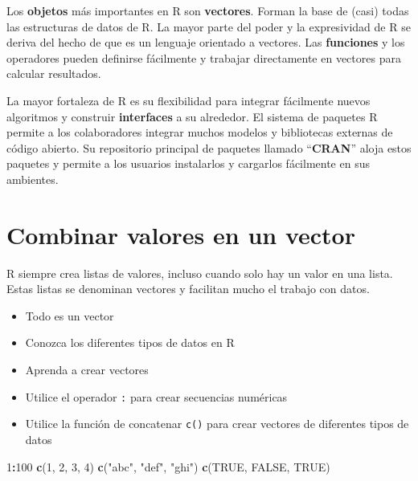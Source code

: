 \documentclass[
]{book}
\newenvironment{Shaded}{\begin{snugshade}}{\end{snugshade}}
\newcommand{\DecValTok}[1]{\textcolor[rgb]{0.00,0.00,0.81}{#1}}
\newcommand{\KeywordTok}[1]{\textcolor[rgb]{0.13,0.29,0.53}{\textbf{#1}}}
\newcommand{\NormalTok}[1]{#1}
\newcommand{\OperatorTok}[1]{\textcolor[rgb]{0.81,0.36,0.00}{\textbf{#1}}}
\newcommand{\OtherTok}[1]{\textcolor[rgb]{0.56,0.35,0.01}{#1}}
\newcommand{\StringTok}[1]{\textcolor[rgb]{0.31,0.60,0.02}{#1}}
\providecommand{\tightlist}{%
  \setlength{\itemsep}{0pt}\setlength{\parskip}{0pt}}
\begin{document}
Los \textbf{objetos} más importantes en R son \textbf{vectores}. Forman la base de (casi) todas las estructuras de datos de R. La mayor parte del poder y la expresividad de R se deriva del hecho de que es un lenguaje orientado a vectores. Las \textbf{funciones} y los operadores pueden definirse fácilmente y trabajar directamente en vectores para calcular resultados.

La mayor fortaleza de R es su flexibilidad para integrar fácilmente nuevos algoritmos y construir \textbf{interfaces} a su alrededor. El sistema de paquetes R permite a los colaboradores integrar muchos modelos y bibliotecas externas de código abierto. Su repositorio principal de paquetes llamado ``\textbf{CRAN}'' aloja estos paquetes y permite a los usuarios instalarlos y cargarlos fácilmente en sus ambientes.

\hypertarget{combinar-valores-en-un-vector}{%
\section{Combinar valores en un vector}\label{combinar-valores-en-un-vector}}

R siempre crea listas de valores, incluso cuando solo hay un valor en una lista. Estas listas se denominan vectores y facilitan mucho el trabajo con datos.

\begin{itemize}
\tightlist
\item
  Todo es un vector
\item
  Conozca los diferentes tipos de datos en R
\item
  Aprenda a crear vectores
\item
  Utilice el operador \texttt{:} para crear secuencias numéricas
\item
  Utilice la función de concatenar \texttt{c()} para crear vectores de diferentes tipos de datos
\end{itemize}

\begin{Shaded}
\begin{Highlighting}[]
\DecValTok{1}\OperatorTok{:}\DecValTok{100}
\KeywordTok{c}\NormalTok{(}\DecValTok{1}\NormalTok{, }\DecValTok{2}\NormalTok{, }\DecValTok{3}\NormalTok{, }\DecValTok{4}\NormalTok{)}
\KeywordTok{c}\NormalTok{(}\StringTok{"abc"}\NormalTok{, }\StringTok{"def"}\NormalTok{, }\StringTok{"ghi"}\NormalTok{)}
\KeywordTok{c}\NormalTok{(}\OtherTok{TRUE}\NormalTok{, }\OtherTok{FALSE}\NormalTok{, }\OtherTok{TRUE}\NormalTok{)}
\end{Highlighting}
\end{Shaded}
\end{document}
